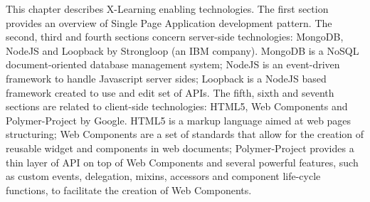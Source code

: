 This chapter describes X-Learning enabling technologies.
The first section provides an overview of Single Page Application development pattern.
The second, third and fourth sections concern server-side technologies: MongoDB, NodeJS and Loopback by Strongloop (an IBM company). MongoDB is a NoSQL document-oriented database management system; NodeJS is an event-driven framework to handle Javascript server sides; Loopback is a NodeJS based framework created to use and edit set of APIs.
The fifth, sixth and seventh sections are related to client-side technologies: HTML5, Web Components and Polymer-Project by Google. HTML5 is a markup language aimed at web pages structuring; Web Components are a set of standards that allow for the creation of reusable widget and components in  web  documents;  Polymer-Project provides a thin layer  of API on top of Web Components and several powerful features, such as custom events, delegation, mixins, accessors and component life-cycle functions, to facilitate the creation of Web  Components.
